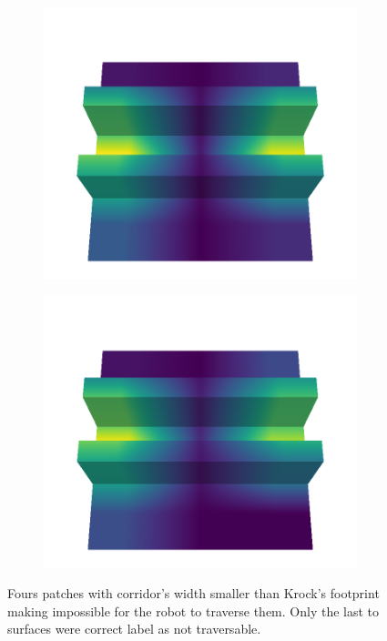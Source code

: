 \documentclass[../document.tex]{subfiles}
\begin{document}
\begin{figure}[htbp]
\begin{subfigure}[b]{0.24\linewidth}
    \end{subfigure}
    \begin{subfigure}[b]{0.24\linewidth}
    \includegraphics[width=\linewidth]{../img/5/custom_patches/tunnel/all/08-3d-grad.png}
    \end{subfigure}
    \begin{subfigure}[b]{0.24\linewidth}
    \includegraphics[width=\linewidth]{../img/5/custom_patches/tunnel/all/09-3d-grad.png}
    \end{subfigure}
    \caption{Fours patches with corridor's width smaller than Krock's footprint making impossible for the robot to traverse them. Only the last to surfaces were correct label as not traversable.}
    \label{fig : tunnels-grad-cam}
\end{figure}
\end{document}
